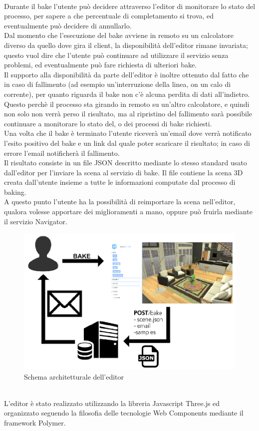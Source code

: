 \\
Durante il bake l’utente può decidere attraverso l’editor di monitorare lo stato del processo, per sapere a che percentuale di completamento si trova, ed eventualmente può decidere di annullarlo. 
\\
Dal momento che l’esecuzione del bake avviene in remoto su un calcolatore diverso da quello dove gira il client, la disponibilità dell’editor rimane invariata; questo vuol dire che l’utente può continuare ad utilizzare il servizio senza problemi, ed eventualmente può fare richiesta di ulteriori bake. 
\\
Il supporto alla disponibilità da parte dell’editor è inoltre ottenuto dal fatto che in caso di fallimento (ad esempio un’interruzione della linea, on un calo di corrente), per quanto riguarda il bake non c’è alcuna perdita di dati all’indietro. Questo perchè il processo sta girando in remoto su un’altro calcolatore, e quindi non solo non verrà perso il risultato, ma al ripristino del fallimento sarà possibile continuare a monitorare lo stato del, o dei processi di bake richiesti.
\\
Una volta che il bake è terminato l’utente riceverà un’email dove verrà notificato l’esito positivo del bake e un link dal quale poter scaricare il risultato; in caso di errore l’email notificherà il fallimento. 
\\
Il risultato consiste in un file JSON descritto mediante lo stesso standard usato dall’editor per l’inviare la scena al servizio di bake. Il file contiene la scena 3D creata dall’utente insieme a tutte le informazioni computate dal processo di baking.
\\
A questo punto l’utente ha la possibilità di reimportare la scena nell’editor, qualora volesse apportare dei miglioramenti a mano, oppure può fruirla mediante il servizio Navigator.
\\
\begin{figure}[htb]
 \centering
 \includegraphics[width=0.8\linewidth]{images/chapter_architettura_sistema/as_editor.png}\hfill
 \caption[Schema architetturale editor]{Schema architetturale dell'editor}
 \label{fig:as_editor}
\end{figure}
\\
L'editor è stato realizzato utilizzando la libreria Javascript Three.js ed organizzato seguendo la filosofia delle tecnologie Web Components mediante il framework Polymer.
